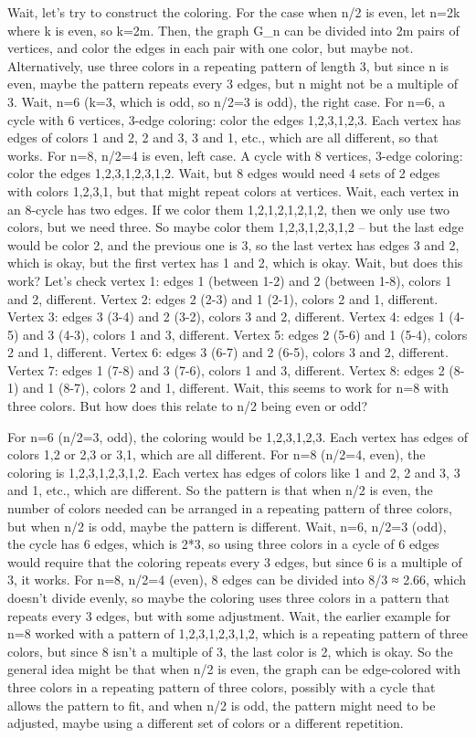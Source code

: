 Wait, let's try to construct the coloring. For the case when n/2 is even, let n=2k where k is even, so k=2m. Then, the graph G_n can be divided into 2m pairs of vertices, and color the edges in each pair with one color, but maybe not. Alternatively, use three colors in a repeating pattern of length 3, but since n is even, maybe the pattern repeats every 3 edges, but n might not be a multiple of 3. Wait, n=6 (k=3, which is odd, so n/2=3 is odd), the right case. For n=6, a cycle with 6 vertices, 3-edge coloring: color the edges 1,2,3,1,2,3. Each vertex has edges of colors 1 and 2, 2 and 3, 3 and 1, etc., which are all different, so that works. For n=8, n/2=4 is even, left case. A cycle with 8 vertices, 3-edge coloring: color the edges 1,2,3,1,2,3,1,2. Wait, but 8 edges would need 4 sets of 2 edges with colors 1,2,3,1, but that might repeat colors at vertices. Wait, each vertex in an 8-cycle has two edges. If we color them 1,2,1,2,1,2,1,2, then we only use two colors, but we need three. So maybe color them 1,2,3,1,2,3,1,2 – but the last edge would be color 2, and the previous one is 3, so the last vertex has edges 3 and 2, which is okay, but the first vertex has 1 and 2, which is okay. Wait, but does this work? Let's check vertex 1: edges 1 (between 1-2) and 2 (between 1-8), colors 1 and 2, different. Vertex 2: edges 2 (2-3) and 1 (2-1), colors 2 and 1, different. Vertex 3: edges 3 (3-4) and 2 (3-2), colors 3 and 2, different. Vertex 4: edges 1 (4-5) and 3 (4-3), colors 1 and 3, different. Vertex 5: edges 2 (5-6) and 1 (5-4), colors 2 and 1, different. Vertex 6: edges 3 (6-7) and 2 (6-5), colors 3 and 2, different. Vertex 7: edges 1 (7-8) and 3 (7-6), colors 1 and 3, different. Vertex 8: edges 2 (8-1) and 1 (8-7), colors 2 and 1, different. Wait, this seems to work for n=8 with three colors. But how does this relate to n/2 being even or odd?

For n=6 (n/2=3, odd), the coloring would be 1,2,3,1,2,3. Each vertex has edges of colors 1,2 or 2,3 or 3,1, which are all different. For n=8 (n/2=4, even), the coloring is 1,2,3,1,2,3,1,2. Each vertex has edges of colors like 1 and 2, 2 and 3, 3 and 1, etc., which are different. So the pattern is that when n/2 is even, the number of colors needed can be arranged in a repeating pattern of three colors, but when n/2 is odd, maybe the pattern is different. Wait, n=6, n/2=3 (odd), the cycle has 6 edges, which is 2*3, so using three colors in a cycle of 6 edges would require that the coloring repeats every 3 edges, but since 6 is a multiple of 3, it works. For n=8, n/2=4 (even), 8 edges can be divided into 8/3 ≈ 2.66, which doesn't divide evenly, so maybe the coloring uses three colors in a pattern that repeats every 3 edges, but with some adjustment. Wait, the earlier example for n=8 worked with a pattern of 1,2,3,1,2,3,1,2, which is a repeating pattern of three colors, but since 8 isn't a multiple of 3, the last color is 2, which is okay. So the general idea might be that when n/2 is even, the graph can be edge-colored with three colors in a repeating pattern of three colors, possibly with a cycle that allows the pattern to fit, and when n/2 is odd, the pattern might need to be adjusted, maybe using a different set of colors or a different repetition.


